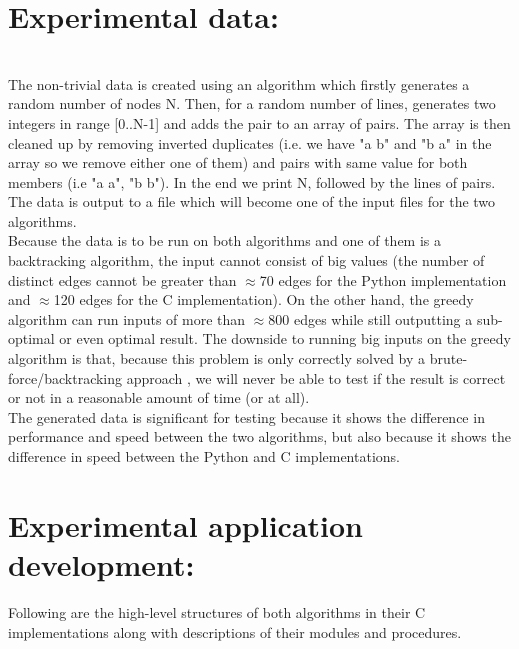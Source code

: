 \documentclass[12pt]{article}
\begin{document}
\section{Experimental data:} \quad \\
\indent The non-trivial data is created using an algorithm which firstly generates a random number of nodes N. Then, for a random number of lines, generates two integers in range [0..N-1] and adds the pair to an array of pairs. The array is then cleaned up by removing inverted duplicates (i.e. we have "a b" and "b a" in the array so we remove either one of them) and pairs with same value for  both members (i.e "a a", "b b"). In the end we print N, followed by the lines of pairs. The data is output to a file which will become one of the input files for the two algorithms. \quad \\
\indent Because the data is to be run on both algorithms and one of them is a backtracking algorithm, the input cannot consist of big values (the number of distinct edges cannot be greater than $\approx$70 edges for the Python implementation and $\approx$120 edges for the C implementation). On the other hand, the greedy algorithm can run inputs of more than $\approx$800 edges while still outputting a sub-optimal or even optimal result. The downside to running big inputs on the greedy algorithm is that, because this problem is only correctly solved by a brute-force/backtracking approach \cite{brittanica}, we will never be able to test if the result is correct or not in a reasonable amount of time (or at all). \\
\indent The generated data is significant for testing because it shows the difference in performance and speed between the two algorithms, but also because it shows the difference in speed between the Python and C implementations. \pagebreak

\section{Experimental application development:}

Following are the high-level structures of both algorithms in their C implementations along with descriptions of their modules and procedures.
\end{document}
